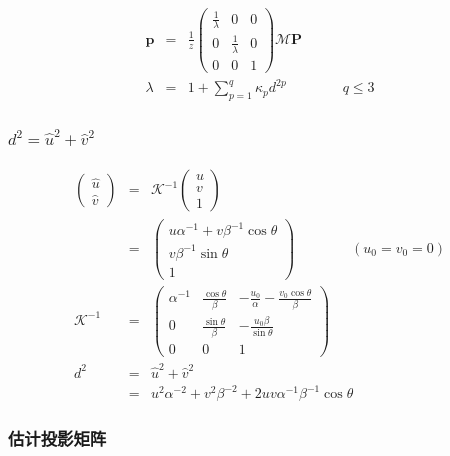 \documentclass{beamer}
\newcommand{\nospace}{}
\newcommand{\tmmathbf}[1]{\ensuremath{\boldsymbol{#1}}}
\begin{document}
{{\begin{frame}
  
  \begin{eqnarray*}
    \tmmathbf{p} & = & \frac{1}{z} \left(\begin{array}{ccc}
      \frac{1}{\lambda} & 0 & 0\\
      0 & \frac{1}{\lambda} & 0\\
      0 & 0 & 1
    \end{array}\right) \mathcal{M}\tmmathbf{P}\\
    \lambda & = & 1 + \sum_{p = 1}^q \kappa_p d^{2 p} \hspace{4em} q \leqslant
    3
  \end{eqnarray*}
\end{frame}}{\begin{frame}
  \frametitle{$d^2 = \hat{u}^2 + \hat{v}^2$}
  \begin{eqnarray*}
    \left(\begin{array}{c}
      \hat{u}\\
      \hat{v}
    \end{array}\right) & = & \mathcal{K}^{- 1} \left(\begin{array}{c}
      u\\
      v\\
      1
    \end{array}\right)\\
    & = & \left(\begin{array}{c}
      u \alpha^{- 1} + v \beta^{- 1} \cos \theta\\
      v \beta^{- 1} \sin \theta\\
      1
    \end{array}\right) \hspace{4em} (u_0 = v_0 = 0)\\
    \mathcal{K}^{- 1} & = & \left(\begin{array}{ccc}
      \alpha^{- 1} & \frac{\cos \theta}{\beta} & - \frac{u_0}{\alpha} -
      \frac{v_0 \cos \theta}{\beta}\\
      0 & \frac{\sin \theta}{\beta} & - \frac{u_0 \beta}{\sin \theta}\\
      0 & 0 & 1
    \end{array}\right)\\
    d^2 & = & \hat{u}^2 + \hat{v}^2\\
    & = & u^2 \alpha^{- 2} + v^2 \beta^{- 2} + 2 u \nospace v \alpha^{- 1}
    \beta^{- 1} \cos \theta
  \end{eqnarray*}
\end{frame}}{\begin{frame}
  \frametitle{估计投影矩阵}

\end{frame}}}
\end{document}
